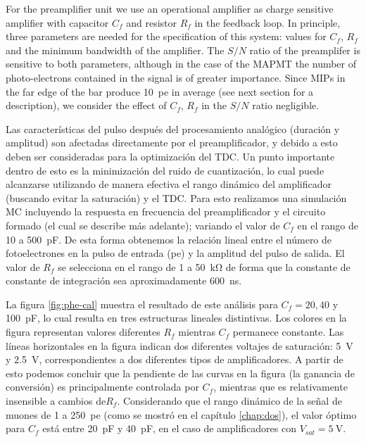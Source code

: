 For the preamplifier unit we use an operational amplifier as charge sensitive amplifier with capacitor $C_{f}$ and resistor $R_{f}$ in the feedback loop. In principle, three parameters are needed for the specification of this system: values for $C_{f}$, $R_{f}$ and the minimum bandwidth of the amplifier. The $S/N$ ratio of the preamplifer is sensitive to both parameters, although in the case of the MAPMT the number of photo-electrons contained in the signal is of greater importance. Since MIPs in the far edge of the bar produce  \SI{10}{pe} in average (see next section for a description), we consider the effect of $C_{f}$, $R_{f}$ in the $S/N$ ratio negligible.

Las características del pulso después del procesamiento analógico (duración y amplitud) son afectadas directamente por el preamplificador, y debido a esto deben ser consideradas para la optimización del TDC. Un punto importante dentro de esto es la minimización del ruido de cuantización, lo cual puede alcanzarse utilizando de manera efectiva el rango dinámico del amplificador (buscando evitar la saturación) y el TDC. Para esto realizamos una simulación MC incluyendo la respuesta en frecuencia del preamplificador y el circuito formado (el cual se describe más adelante); variando el valor de $C_{f}$ en el rango de \num{10} a \SI{500}{\pico\farad}. De esta forma obtenemos la relación lineal entre el número de fotoelectrones en la pulso de entrada (\si{pe}) y la amplitud del pulso de salida. El valor de $R_{f}$ se selecciona en el rango de \num{1} a \SI{50}{\kilo\ohm} de forma que la constante de constante de integración sea aproximadamente \SI{600}{\ns}.

La figura \ref{fig:phe-cal} muestra el resultado de este análisis para $C_ {f}=20,40$ y \SI{100}{\pico\farad}, lo cual resulta en tres estructuras lineales distintivas. Los colores en la figura representan valores diferentes $R_{f}$ mientras $C_{f}$ permanece constante. Las líneas horizontales en la figura indican dos diferentes voltajes de saturación: \SI{5}{\volt} y \SI{2.5}{\volt}, correspondientes a dos diferentes tipos de amplificadores. A partir de esto podemos concluir que la pendiente de las curvas en la figura (la ganancia de conversión) es principalmente controlada por $C_{f}$, mientras que es relativamente insensible a cambios de$R_{f}$. Considerando que el rango dinámico de la señal de muones de \num{1} a \SI{250}{pe} (como se mostró en el capítulo \ref{chap:dos}), el valor óptimo para $C_{f}$ está entre \SI{20}{\pico\farad} y \SI{40}{\pico\farad}, en el caso de amplificadores con $V_{sat}=\SI{5}{\volt}$.

